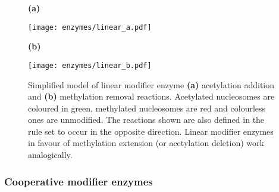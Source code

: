                 \begin{figure}[htpb!]
                    \centering
                    \begin{minipage}[t][5cm]{\textwidth}
                        \begin{minipage}{0.15\textwidth}
                            \caption*{\small \textbf{(a)}}
                        \end{minipage}
                        \begin{minipage}{0.8\textwidth}
                            \texttt{[image: enzymes/linear\_a.pdf]}
                        \end{minipage}
                        \vfill
                        \begin{minipage}{0.15\textwidth}
                            \caption*{\small \textbf{(b)}}
                        \end{minipage}
                        \begin{minipage}{0.8\textwidth}
                            \texttt{[image: enzymes/linear\_b.pdf]}
                        \end{minipage}
                    \end{minipage}
                    \caption{Simplified model of linear modifier enzyme \textbf{(a)} acetylation addition and \textbf{(b)} methylation removal reactions. Acetylated nucleosomes are coloured in green, methylated nucleosomes are red and colourless ones are unmodified. The reactions shown are also defined in the rule set to occur in the opposite direction. Linear modifier enzymes in favour of methylation extension (or acetylation deletion) work analogically.}
                    \label{img:linearEnzymes}
                \end{figure}
            \subsubsection{Cooperative modifier enzymes}
                \label{subsubsec:coopEnzymes}

